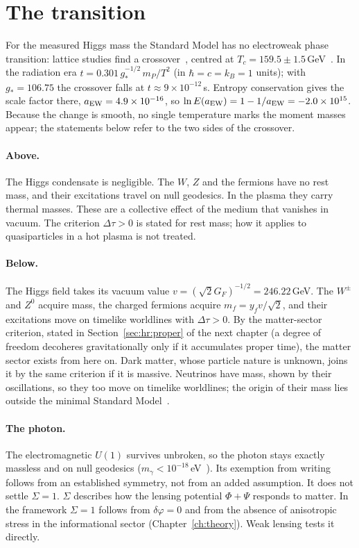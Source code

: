 \section{The transition}\label{sec:ew:transition}
For the measured Higgs mass the Standard Model has no electroweak phase transition: lattice studies find a crossover~\cite{Kajantie1996}, centred at
$T_c=159.5\pm1.5$\,GeV~\cite{DOnofrio2016}. \observed{} In the radiation era $t=0.301\,g_*^{-1/2}\,m_P/T^2$ (in $\hbar=c=k_B=1$ units); with
$g_*=106.75$ the crossover falls at $t\approx9\times10^{-12}$\,s. Entropy conservation gives the scale factor there, $a_{\rm EW}=4.9\times10^{-16}$,
so $\ln E(a_{\rm EW})=1-1/a_{\rm EW}=-2.0\times10^{15}$. \calc{} Because the change is smooth, no single temperature marks the moment masses appear;
the statements below refer to the two sides of the crossover.

\paragraph{Above.} The Higgs condensate is negligible. The $W$, $Z$ and the fermions have no rest mass, and their excitations travel on null
geodesics. In the plasma they carry thermal masses. These are a collective effect of the medium that vanishes in vacuum. The criterion
$\Delta\tau>0$ is stated for rest mass; how it applies to quasiparticles in a hot plasma is not treated. \openprob

\paragraph{Below.} The Higgs field takes its vacuum value $v=(\sqrt2G_F)^{-1/2}=246.22$\,GeV. \calc{} The $W^\pm$ and $Z^0$ acquire mass, the charged
fermions acquire $m_f=y_fv/\sqrt2$, and their excitations move on timelike worldlines with $\Delta\tau>0$. By the matter-sector criterion, stated in
Section~\ref{sec:hr:proper} of the next chapter (a degree of freedom decoheres gravitationally only if it accumulates proper time), the matter sector exists from here on. Dark matter, whose particle nature is unknown, joins it by the same criterion if it
is massive. Neutrinos have mass, shown by their oscillations, so they too move on timelike worldlines; the origin of their mass lies outside the
minimal Standard Model~\cite{PDG2022}. \observed

\paragraph{The photon.} The electromagnetic $U(1)$ survives unbroken, so the photon stays exactly massless and on null geodesics
($m_\gamma<10^{-18}$\,eV~\cite{PDG2024}). Its exemption from writing follows from an established symmetry, not from an added assumption. \derived{}
It does not settle $\Sigma=1$. $\Sigma$ describes how the lensing potential $\Phi+\Psi$ responds to matter. In the framework $\Sigma=1$ follows from
$\delta\varphi=0$ and from the absence of anisotropic stress in the informational sector (Chapter~\ref{ch:theory}). Weak lensing tests it directly.

